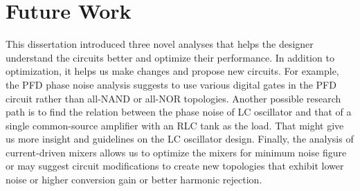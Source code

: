 \chapter{Future Work}

This dissertation introduced three novel analyses that helps the designer understand the circuits better and optimize their performance. In addition to optimization, it
helps us make changes and propose new circuits. For example, the PFD phase noise analysis suggests to use various digital gates in the PFD circuit rather than all-NAND or
all-NOR topologies. Another possible research path is to find the relation between the phase noise of LC oscillator and that of a single common-source amplifier with an
RLC tank as the load. That might give us more insight and guidelines on the LC oscillator design. Finally, the analysis of current-driven mixers allows us to optimize the
mixers for minimum noise figure or may suggest circuit modifications to create new topologies that exhibit lower noise or higher conversion gain or better harmonic
rejection.
